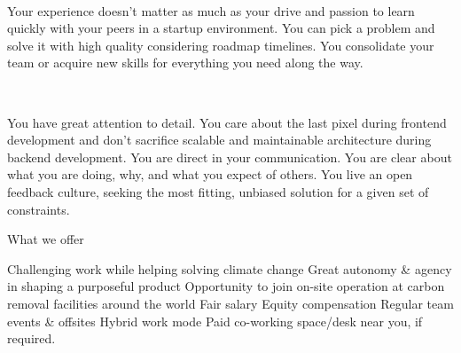 ‍

Your experience doesn’t matter as much as your drive and passion to learn quickly with your peers in a startup environment. You can pick a problem and solve it with high quality considering roadmap timelines. You consolidate your team or acquire new skills for everything you need along the way.

‍

You have great attention to detail. You care about the last pixel during frontend development and don’t sacrifice scalable and maintainable architecture during backend development. You are direct in your communication. You are clear about what you are doing, why, and what you expect of others. You live an open feedback culture, seeking the most fitting, unbiased solution for a given set of constraints.



What we offer



Challenging work while helping solving climate change
Great autonomy & agency in shaping a purposeful product
Opportunity to join on-site operation at carbon removal facilities around the world
Fair salary
Equity compensation
Regular team events & offsites
Hybrid work mode
Paid co-working space/desk near you, if required.

